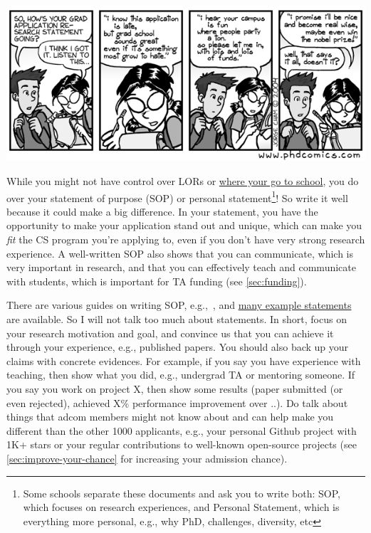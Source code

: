 \documentclass[oneside,11pt]{memoir}
\begin{document}
\begin{center}
  \includegraphics[scale=0.4]{files/c2.png}
\end{center}

While you might not have control over LORs or \hyperref[sec:your-school]{where your go to school}, you do over your
statement of purpose (SOP) or personal statement\footnote{Some schools separate these documents and ask you to write both: SOP, which focuses on research experiences, and Personal Statement, which is everything more personal, e.g., why PhD, challenges, diversity, etc}! So write it well because it could make a big difference.
In your statement, you have the opportunity to make your application stand out and unique, which can make you \emph{fit} the CS program you're applying to, even if you don't have very strong research experience.
A well-written SOP also shows that you can communicate, which is very important in research, and that you can effectively teach and communicate with students, which is important for TA funding (see \autoref{sec:funding}).

There are various guides on writing SOP, e.g.,~\cite{blattman2022writing}, and \href{https://cs-sop.org/}{many example statements} are available. So I will not talk too much about statements. In short, focus on your research motivation and goal, and convince us that you can achieve it through your experience, e.g., published papers. You should also back up your claims with concrete evidences. For example, if you say you have experience with teaching, then show what you did, e.g., undergrad TA or mentoring someone.  If you say you work on project X, then show some results (paper submitted (or even rejected), achieved X\% performance improvement over ..). Do talk about things that adcom members might not know about and can help make you different than the other 1000 applicants, e.g.,  your personal Github project with 1K+ stars or your regular contributions to well-known open-source projects (see \autoref{sec:improve-your-chance} for increasing your admission chance).
\end{document}
